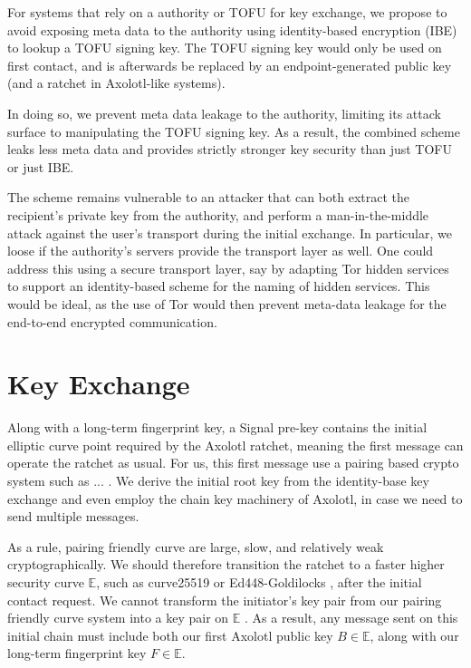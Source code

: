 \documentclass[twoside,letterpaper]{sig-alternate}
\begin{document}
For systems that rely on a authority or TOFU for key
exchange, we propose to avoid exposing meta data to the authority
using identity-based encryption (IBE) to lookup a TOFU
signing key.  The TOFU signing key would only be used on first
contact, and is afterwards be replaced by an endpoint-generated public
key (and a ratchet in Axolotl-like systems).

In doing so, we prevent meta data leakage to the authority, limiting
its attack surface to manipulating the TOFU signing key.  As a result,
the combined scheme leaks less meta data and provides strictly
stronger key security than just TOFU or just IBE.

The scheme remains vulnerable to an attacker that can both extract the
recipient's private key from the authority, and perform a
man-in-the-middle attack against the user's transport during the
initial exchange.  In particular, we loose if the authority's servers
provide the transport layer as well.  One could address this using a
secure transport layer, say by adapting Tor hidden services to support
an identity-based scheme for the naming of hidden services.  This
would be ideal, as the use of Tor would then prevent meta-data leakage
for the end-to-end encrypted communication.


\section{Key Exchange}

Along with a long-term fingerprint key,
a Signal pre-key contains the initial elliptic curve point required
by the Axolotl ratchet, meaning
 the first message can operate the ratchet as usual.
%
For us, this first message use a pairing based crypto system
 such as ... \cite{}.
We derive the initial root key from the identity-base key
exchange and even employ the chain key machinery of Axolotl,
 in case we need to send multiple messages.

As a rule, pairing friendly curve are large, slow, and relatively
 weak cryptographically.
We should therefore transition the ratchet to a faster higher security
curve $\mathbb{E}$, such as curve25519 \cite{} or
 Ed448-Goldilocks \cite{}, after the initial contact request.
We cannot transform the initiator's key pair from
 our pairing friendly curve system
into a key pair on $\mathbb{E}$ \cite{??no_homomorphism??}.
As a result, any message sent on this initial chain must include both
 our first Axolotl public key $B \in \mathbb{E}$, along with
 our long-term fingerprint key $F \in \mathbb{E}$.
\end{document}
